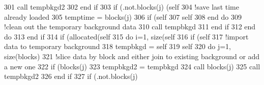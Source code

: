 \begin{DoxyCode}
301                             \textcolor{keyword}{call }tempbkgd2%
302 \textcolor{keywordflow}{                        end if}
303                         \textcolor{keywordflow}{if} (.not.blocks(j)%
      (self%
304                         \textcolor{comment}{!save last time already loaded}
305                         temptime = blocks(j)%
306                         \textcolor{keywordflow}{if} (self%
307                         self%
308 \textcolor{keywordflow}{                    end do}
309                     \textcolor{comment}{!clean out the temporary background data}
310                     \textcolor{keyword}{call }tempbkgd%
311 \textcolor{keywordflow}{                end if}
312 \textcolor{keywordflow}{            end do}
313 \textcolor{keywordflow}{        end if}
314         \textcolor{keywordflow}{if} (\textcolor{keyword}{allocated}(self%
315             \textcolor{keywordflow}{do} i=1, \textcolor{keyword}{size}(self%
316                 \textcolor{keywordflow}{if} (self%
317                     \textcolor{comment}{!import data to temporary background}
318                     tempbkgd = self%
319                     self%
320                     \textcolor{keywordflow}{do} j=1, \textcolor{keyword}{size}(blocks)
321                         \textcolor{comment}{!slice data by block and either join to existing background or add a new one}
322                         \textcolor{keywordflow}{if} (blocks(j)%
323                             tempbkgd2 = tempbkgd%
324                             \textcolor{keyword}{call }blocks(j)%
325                             \textcolor{keyword}{call }tempbkgd2%
326 \textcolor{keywordflow}{                        end if}
327                         \textcolor{keywordflow}{if} (.not.blocks(j)%

\end{DoxyCode}
